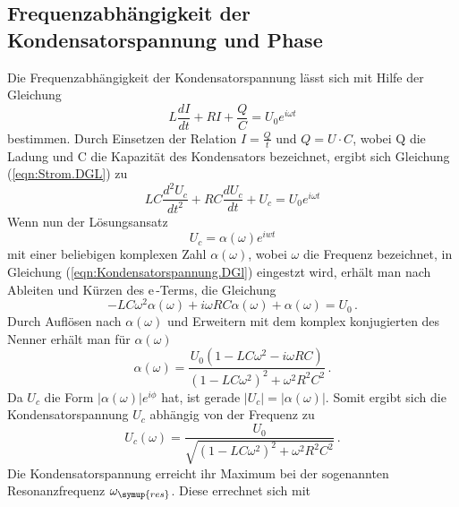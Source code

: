     \subsection{Frequenzabhängigkeit der Kondensatorspannung und Phase}
        Die Frequenzabhängigkeit der Kondensatorspannung lässt sich mit Hilfe der Gleichung
        \begin{equation}
            \label{eqn:Strom.DGL}
            L \frac{dI}{dt}+ R I + \frac{Q}{C} = U_0 e^{i\omega t}
        \end{equation}
        bestimmen. Durch Einsetzen der Relation $I=\frac{Q}{t}$ und $Q=U\cdot C$, wobei Q die Ladung und C die Kapazität des Kondensators bezeichnet, ergibt sich Gleichung (\ref{eqn:Strom.DGL}) zu
        \begin{equation}
            \label{eqn:Kondensatorspannung.DGl}
            LC \frac{d^2U_c}{dt^2}+RC\frac{dU_c}{dt}+U_c= U_0 e^{i\omega t}
        \end{equation}
        Wenn nun der Lösungsansatz
        \begin{equation}
            U_c= \alpha (\omega) e^{iwt}
        \end{equation}
        mit einer beliebigen komplexen Zahl $\alpha(\omega)$, wobei $\omega$ die Frequenz bezeichnet, in Gleichung (\ref{eqn:Kondensatorspannung.DGl}) eingestzt wird, erhält man nach Ableiten und Kürzen des e\,-Terms, die Gleichung
        \begin{equation}
            -LC{\omega}^2 \alpha(\omega)+ i\omega RC \alpha(\omega) + \alpha(\omega) = U_0 \, .
        \end{equation}
        Durch Auflösen nach $\alpha(\omega)$ und Erweitern mit dem komplex konjugierten des Nenner erhält man für $\alpha(\omega)$
        \begin{equation}
            \alpha(\omega) = \frac{U_0(1-LC{\omega}^2-i\omega RC)}{(1-LC{\omega}^2)^2+{\omega}^2R^2C^2} \, .
        \end{equation}
        Da $U_c$ die Form $ \lvert \alpha(\omega) \rvert e^{i\phi}$ hat, ist gerade $\lvert U_c \rvert =\lvert \alpha(\omega) \rvert $.
        Somit ergibt sich die Kondensatorspannung $U_c$ abhängig von der Frequenz zu
        \begin{equation}
            \label{eqn:spannung}
            U_c(\omega)=\frac{U_0}{\sqrt{(1-LC{\omega}^2)^2+{\omega}^2R^2C^2}} \, .
        \end{equation}
        Die Kondensatorspannung erreicht ihr Maximum bei der sogenannten Resonanzfrequenz $\omega_{\symup{res}}$. Diese errechnet sich mit
